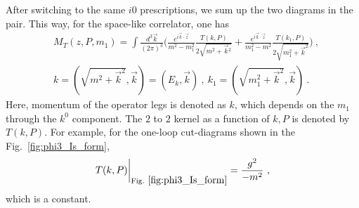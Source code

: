 \documentclass[a4paper,11pt]{article}
\begin{document}
After switching to the same $i0$ prescriptions, we sum up the two diagrams in the pair.  This way, for the space-like correlator, one has 
\begin{align}
&M_{T}(z,P,m_1)=\int \frac{d^3\vec{k}}{(2\pi)^3}\bigg(\frac{e^{i\vec{k}\cdot \vec{z}} }{m^2-m_1^2}\frac{T(k,P) }{2\sqrt{m^2+\vec{k}{^2}}}+\frac{e^{i\vec{k}\cdot \vec{z}} }{m_1^2-m^2}\frac{T(k_1,P) }{2\sqrt{m_1^2+\vec{k}^2}} \bigg) \  , \label{eq:spaceinni} \\
&k=\left(\sqrt{m^2+\vec{k}^2},\vec{k}\right)=(E_k,\vec{k}) \ , \ k_1=\left(\sqrt{m_1^2+\vec{k}^2},\vec{k}\right) \ . 
\end{align}
Here, momentum of the operator legs is denoted as $k$, which depends on the $m_1$ through the $k^0$ component. The $2$ to $2$ kernel as a function of $k,P$ is denoted by $T(k,P)$. For example, for the one-loop cut-diagrams shown in the Fig.~\ref{fig:phi3_Is_form},
\begin{align}
T(k,P)\bigg|_{\rm Fig.~\ref{fig:phi3_Is_form}}=\frac{g^2}{-m^2} \ , 
\end{align}
which is a constant. 
\end{document}
